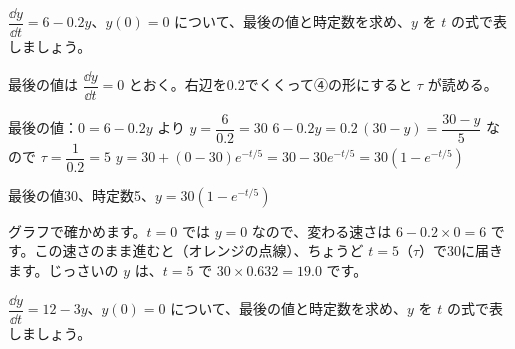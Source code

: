 \begin{reidai}[$\frac{\dd y}{\dd t}=b-ay$ の形を読む]
$\dfrac{\dd y}{\dd t}=6-0.2y$、$y(0)=0$ について、最後の値と時定数を求め、$y$ を $t$ の式で表しましょう。\par
\kangaekata 最後の値は $\dfrac{\dd y}{\dd t}=0$ とおく。右辺を0.2でくくって④の形にすると $\tau$ が読める。\par
\shiki 最後の値：$0=6-0.2y$ より $y=\dfrac{6}{0.2}=30$\bkvieq
$6-0.2y=0.2\,(30-y)=\dfrac{30-y}{5}$ なので $\tau=\dfrac{1}{0.2}=5$\bkvieq
$y=30+(0-30)e^{-t/5}=30-30e^{-t/5}=30(1-e^{-t/5})$\par
\kotae 最後の値30、時定数5、$y=30(1-e^{-t/5})$
\end{reidai}
\noindent\begin{minipage}[c]{0.5\linewidth}
\end{minipage}\hfill
\begin{minipage}[c]{0.46\linewidth}\raggedright
グラフで確かめます。$t=0$ では $y=0$ なので、変わる速さは $6-0.2\times0=6$ です。この速さのまま進むと（オレンジの点線）、ちょうど $t=5$（$\tau$）で30に届きます。じっさいの $y$ は、$t=5$ で $30\times0.632=19.0$ です。
\end{minipage}
\par\vspace{4pt}

\begin{jibun}
$\dfrac{\dd y}{\dd t}=12-3y$、$y(0)=0$ について、最後の値と時定数を求め、$y$ を $t$ の式で表しましょう。
\end{jibun}

